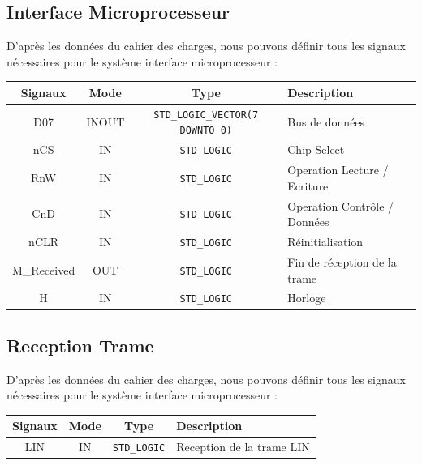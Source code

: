 \subsection{Interface Microprocesseur}

D'après les données du cahier des charges, nous pouvons définir tous les signaux nécessaires pour le système interface microprocesseur : 

\begin{center}
\renewcommand{\arraystretch}{1.2} %
\small %
\begin{tabularx}{\textwidth}{|c||c|c|X|}
    \hline			
    \textbf{Signaux} & \textbf{Mode} & \textbf{Type} & \textbf{Description}  \\ \hline 
    D07 & INOUT & \texttt{STD\_LOGIC\_VECTOR(7 DOWNTO 0)} & Bus de données \\
    nCS & IN & \texttt{STD\_LOGIC} & Chip Select \\
    RnW & IN & \texttt{STD\_LOGIC} & Operation Lecture / Ecriture \\
    CnD & IN & \texttt{STD\_LOGIC} & Operation Contrôle / Données \\
    nCLR & IN & \texttt{STD\_LOGIC} & Réinitialisation \\
    M\_Received & OUT & \texttt{STD\_LOGIC} & Fin de réception de la trame \\
    H & IN & \texttt{STD\_LOGIC} & Horloge \\
    \hline  
\end{tabularx}
\end{center}


\subsection{Reception Trame}

D'après les données du cahier des charges, nous pouvons définir tous les signaux nécessaires pour le système interface microprocesseur : 

\begin{center}
\renewcommand{\arraystretch}{1.2} %
\small %
\begin{tabularx}{\textwidth}{|c||c|c|X|}
    \hline			
    \textbf{Signaux} & \textbf{Mode} & \textbf{Type} & \textbf{Description}  \\ \hline 
    LIN & IN & \texttt{STD\_LOGIC} & Reception de la trame LIN \\
    \hline  
\end{tabularx}
\end{center}

